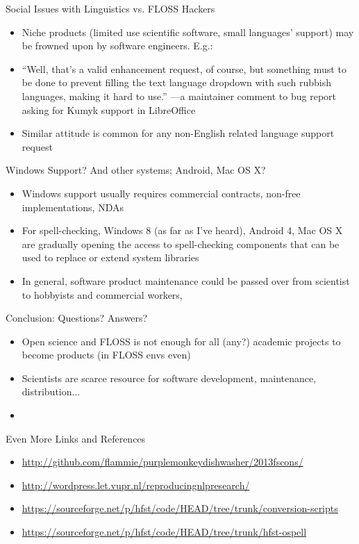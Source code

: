 \documentclass[t,12pt]{beamer}
\begin{document}
\begin{frame}{Social Issues with Linguistics vs. FLOSS Hackers}
    \begin{itemize}
        \item Niche products (limited use scientific software, small
            languages' support) may be frowned upon by software engineers. E.g.:
        \item ``Well, that's a valid enhancement request, of course, but
            something must to be done to prevent filling the text language
            dropdown with \alert{such rubbish languages}, making it hard to
            use.'' ---a maintainer comment to bug report asking for Kumyk
            support in LibreOffice
        \item Similar attitude is common for any non-English related language
            support request
    \end{itemize}
\end{frame}

\begin{frame}{Windows Support? And other systems; Android, Mac OS X?}
    \begin{itemize}
        \item Windows support usually requires commercial contracts, non-free
            implementations, NDAs
        \item For spell-checking, Windows 8 (as far as I've heard),
            Android 4, Mac OS X are gradually
            opening the access to spell-checking components that can be used
            to replace or extend system libraries
        \item In general, software product maintenance could be passed over
            from scientist to hobbyists and commercial workers, 
    \end{itemize}
\end{frame}

\begin{frame}{Conclusion: Questions? Answers?}
    \begin{itemize}
        \item Open science and FLOSS is not enough for all (any?) academic
            projects to become products (in FLOSS envs even)
        \item Scientists are scarce resource for software development,
            maintenance, distribution...
        \item
    \end{itemize}
\end{frame}

\begin{frame}{Even More Links and References}
    \begin{itemize}
        \item \url{http://github.com/flammie/purplemonkeydishwasher/2013fscons/}
        \item \url{http://wordpress.let.vupr.nl/reproducingnlpresearch/}
        \item \url{https://sourceforge.net/p/hfst/code/HEAD/tree/trunk/conversion-scripts}
        \item \url{https://sourceforge.net/p/hfst/code/HEAD/tree/trunk/hfst-ospell}
    \end{itemize}
\end{frame}
\end{document}
